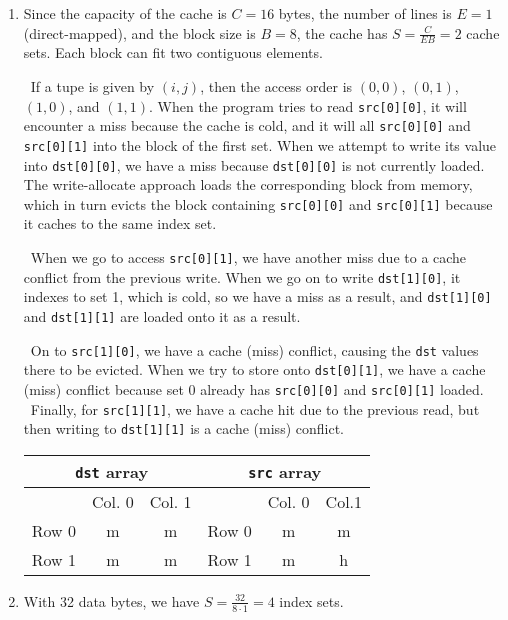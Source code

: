\documentclass[12pt]{article}
\newenvironment{sol}[1][Solution]{\begin{trivlist}
		\item[\hskip \labelsep {\bfseries #1:}]}{\end{trivlist}}
\begin{document}
\begin{sol}
	\begin{enumerate}[label=(\alph*)]
		\item Since the capacity of the cache is $C=16$ bytes, the number of lines is $E=1$ (direct-mapped),
		and the block size is $B=8$, the cache has $S=\frac{C}{EB}=2$ cache sets.
		Each block can fit two contiguous elements.
		
		\
		If a tupe is given by $(i,j)$, then the access order is $(0, 0)$, $(0, 1)$, $(1,0)$, and
		$(1,1)$. When the program tries to read \texttt{src[0][0]}, it will encounter a miss because
		the cache is cold, and it will all \texttt{src[0][0]} and \texttt{src[0][1]} into the
		block of the first set. When we attempt to write its value into \texttt{dst[0][0]}, we
		have a miss because \texttt{dst[0][0]} is not currently loaded. The write-allocate approach
		loads the corresponding block from memory, which in turn evicts the block containing
		\texttt{src[0][0]} and \texttt{src[0][1]} because it caches to the same index set.
		
		\
		When we go to access \texttt{src[0][1]}, we have another miss due to a cache conflict
		from the previous write. When we go on to write \texttt{dst[1][0]}, it indexes to
		set 1, which is cold, so we have a miss as a result, and \texttt{dst[1][0]} and
		\texttt{dst[1][1]} are loaded onto it as a result.
		
		\
		On to \texttt{src[1][0]}, we have a cache (miss) conflict, causing the \texttt{dst} values
		there to be evicted. When we try to store onto \texttt{dst[0][1]}, we have a cache (miss)
		conflict because set 0 already has \texttt{src[0][0]} and \texttt{src[0][1]} loaded.
		\
		Finally, for \texttt{src[1][1]}, we have a cache hit due to the previous read, but
		then writing to \texttt{dst[1][1]} is a cache (miss) conflict.
		\begin{center}
			\begin{tabular}{ccc|ccc}
				\multicolumn{3}{c}{\texttt{dst} array} & \multicolumn{3}{c}{\texttt{src} array}\\
				\hline
				{} & Col. 0 & Col. 1 & {} & Col. 0 & Col.1\\
				\hline
				Row 0 & m & m & Row 0 & m & m\\
				Row 1 & m & m & Row 1 & m & h
			\end{tabular}
		\end{center}
		\item With 32 data bytes, we have $S=\frac{32}{8\cdot 1}=4$ index sets.
		

\end{enumerate}
\end{sol}
\end{document}
